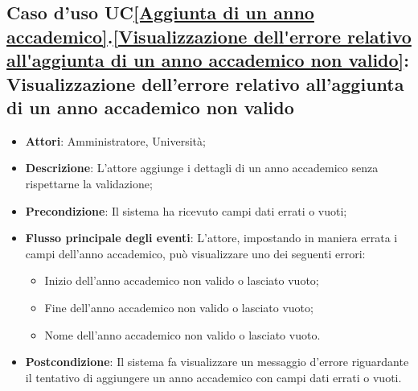 \subsection{Caso d'uso UC\ref{Aggiunta di un anno accademico}.\ref{Visualizzazione dell'errore relativo all'aggiunta di un anno accademico non valido}: Visualizzazione dell'errore relativo all'aggiunta di un anno accademico non valido}
\begin{itemize}
	\item \textbf{Attori}: Amministratore, Università;
	\item \textbf{Descrizione}: L'attore aggiunge i dettagli di un anno accademico senza rispettarne la validazione;
	\item \textbf{Precondizione}: Il sistema ha ricevuto campi dati errati o vuoti;
	\item \textbf{Flusso principale degli eventi}: L'attore, impostando in maniera errata i campi dell'anno accademico, può visualizzare uno dei seguenti errori:
	\begin{itemize}
		\item Inizio dell'anno accademico non valido o lasciato vuoto;
		\item Fine dell'anno accademico non valido o lasciato vuoto;
		\item Nome dell'anno accademico non valido o lasciato vuoto.
	\end{itemize}
	\item \textbf{Postcondizione}: Il sistema fa visualizzare un messaggio d'errore riguardante il tentativo di aggiungere un anno accademico con campi dati errati o vuoti.
\end{itemize}







